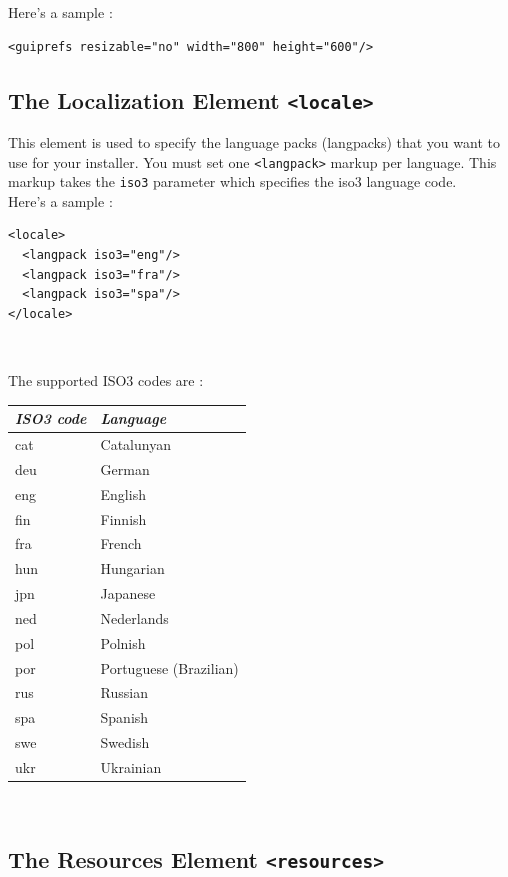 Here's a sample :
\footnotesize
\begin{verbatim}
<guiprefs resizable="no" width="800" height="600"/>
\end{verbatim}
\normalsize

\subsection{The Localization Element \texttt{<locale>}}

This element is used to specify the language packs (langpacks) that you want to
use for your installer. You must set one \texttt{<langpack>} markup per
language. This markup takes the \texttt{iso3} parameter which specifies the iso3
language code.\\

Here's a sample :\\
\footnotesize
\begin{verbatim}
<locale>
  <langpack iso3="eng"/>
  <langpack iso3="fra"/>
  <langpack iso3="spa"/>
</locale>
\end{verbatim}\
\normalsize

The supported ISO3 codes are :
\begin{center}
\begin{tabular}{|l|l|}
\hline
\textit{ISO3 code} & \textit{Language} \\ \hline
cat & Catalunyan \\ \hline
deu & German \\ \hline
eng & English \\ \hline
fin & Finnish \\ \hline
fra & French \\ \hline
hun & Hungarian \\ \hline
jpn & Japanese \\ \hline
ned & Nederlands \\ \hline
pol & Polnish \\ \hline
por & Portuguese (Brazilian) \\ \hline
rus & Russian \\ \hline
spa & Spanish \\ \hline
swe & Swedish \\ \hline
ukr & Ukrainian \\ \hline
\end{tabular}\
\end{center}

\subsection{The Resources Element \texttt{<resources>}}

